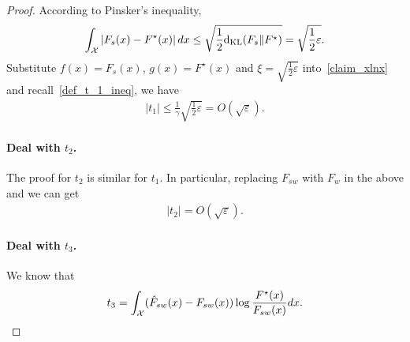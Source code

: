 \begin{proof}
According to Pinsker's inequality,
\begin{align} \label{output_diff}
    \int_{\mathcal{X}}\left| F_s(x) - F^\star(x) \right| d x \le \sqrt{\frac{1}{2}\mathrm{d}_{\mathrm{KL}}(F_s \| F^\star)} = \sqrt{\frac{1}{2}\varepsilon}.
\end{align}
Substitute $f(x)=F_s(x)$, $g(x)=F^\star(x)$ and $\xi = \sqrt{\frac{1}{2}\varepsilon}$ into~\cref{claim_xlnx} and recall~\eqref{def_t_1_ineq}, we have
\begin{align} \label{equation_t_1}
    |t_1| \le \frac{1}{\gamma}\sqrt{\frac{1}{2}\varepsilon} = O(\sqrt{\varepsilon}).
\end{align}




\paragraph{Deal with $t_2$.}
The proof for $t_2$ is similar for $t_1$.
In particular, replacing $F_{sw}$ with $F_w$ in the above and we can get 
\begin{align} \label{equation_t_2}
    |t_2| = O(\sqrt{\varepsilon}).
\end{align}




\paragraph{Deal with $t_3$.}

We know that
$$t_3 = \int_{\mathcal{X}} (\hat{F}_{sw}(x)-F_{sw}(x))\log \frac{F^\star(x)}{F_{sw}(x)} d x.$$


\end{proof}
